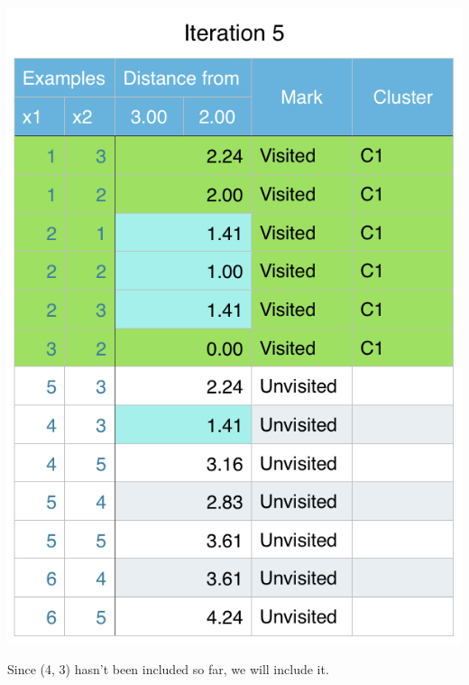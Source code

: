 \documentclass[11pt]{article}
\begin{document}
\begin{center}
\includegraphics[scale=0.60]{dbscan-iter5.png}
\end{center}

Since (4, 3) hasn't been included so far, we will include it.
\end{document}
